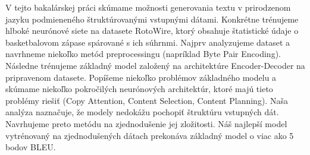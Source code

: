 \documentclass[12pt]{report}
\begin{document}

V tejto bakalárskej práci skúmame možnosti generovania textu v prirodzenom jazyku podmieneného štruktúrovanými vstupnými dátami. Konkrétne trénujeme hlboké neurónové siete na datasete RotoWire, ktorý obsahuje štatistické údaje o basketbalovom zápase spárované s ich súhrnmi. Najprv analyzujeme dataset a navrhneme niekoľko metód preprocessingu (napríklad Byte Pair Encoding). Následne trénujeme základný model založený na architektúre Encoder-Decoder na pripravenom datasete. Popíšeme niekoľko problémov základného modelu a skúmame niekoľko pokročilých neurónových architektúr, ktoré majú tieto problémy riešiť (Copy Attention, Content Selection, Content Planning). Naša analýza naznačuje, že modely nedokážu pochopiť štruktúru vstupných dát. Navrhujeme preto metódu na zjednodušenie jej zložitosti. Náš najlepší model vytrénovaný na zjednodušených dátach prekonáva základný model o viac ako 5 bodov BLEU.
\end{document}
